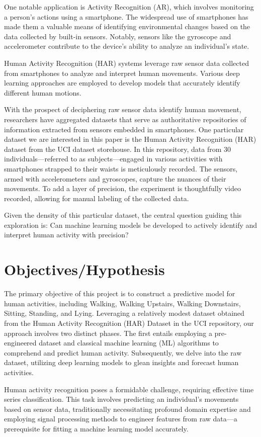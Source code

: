 \documentclass[11pt]{article}
\begin{document}
One notable application is Activity Recognition (AR), which involves monitoring a person's actions using a smartphone. The widespread use of smartphones has made them a valuable means of identifying environmental changes based on the data collected by built-in sensors. Notably, sensors like the gyroscope and accelerometer contribute to the device's ability to analyze an individual's state.

Human Activity Recognition (HAR) systems leverage raw sensor data collected from smartphones to analyze and interpret human movements. Various deep learning approaches are employed to develop models that accurately identify different human motions.


With the  prospect of deciphering raw sensor data identify human movement, researchers have aggregated datasets that serve as authoritative repositories of information extracted from sensors embedded in smartphones. One particular dataset we are interested in this paper is the Human Activity Recognition (HAR) dataset from the UCI dataset storehouse. In this repository, data from 30 individuals—referred to as subjects—engaged in various activities with smartphones strapped to their waists is meticulously recorded. The sensors, armed with accelerometers and gyroscopes, capture the nuances of their movements. To add a layer of precision, the experiment is thoughtfully video recorded, allowing for manual labeling of the collected data.

Given the density of this particular dataset, the central question guiding this exploration is: Can machine learning models be developed to actively identify and interpret human activity with precision?

\section{Objectives/Hypothesis}
The primary objective of this project is to construct a predictive model for human activities, including Walking, Walking Upstairs, Walking Downstairs, Sitting, Standing, and Lying. Leveraging a relatively modest dataset obtained from the Human Activity Recognition (HAR) Dataset in the UCI repository, our approach involves two distinct phases. The first entails employing a pre-engineered dataset and classical machine learning (ML) algorithms to comprehend and predict human activity. Subsequently, we delve into the raw dataset, utilizing deep learning models to glean insights and forecast human activities.

Human activity recognition poses a formidable challenge, requiring effective time series classification. This task involves predicting an individual's movements based on sensor data, traditionally necessitating profound domain expertise and employing signal processing methods to engineer features from raw data—a prerequisite for fitting a machine learning model accurately.
\end{document}
